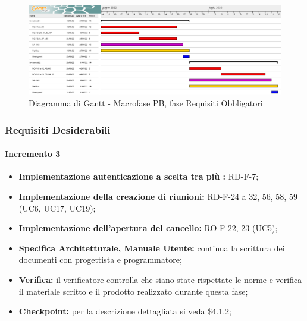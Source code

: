 \begin{landscape}
	\begin{figure}
	\includegraphics[width=\linewidth]{images/PB_obbligatori.png}
    \caption{Diagramma di Gantt - Macrofase PB, fase Requisiti Obbligatori}
	\end{figure}
\end{landscape}

\subsubsection{Requisiti Desiderabili}
\paragraph{Incremento 3}
\begin{itemize}
    \item \textbf{Implementazione autenticazione a scelta tra più :} RD-F-7;
    \item \textbf{Implementazione della creazione di riunioni:} RD-F-24 a 32, 56, 58, 59 (UC6, UC17, UC19);
    \item \textbf{Implementazione dell'apertura del cancello:} RO-F-22, 23 (UC5);
    \item \textbf{Specifica Architetturale, Manuale Utente:} continua la scrittura dei documenti con progettista e programmatore;
    \item \textbf{Verifica:} il verificatore controlla che siano state rispettate le norme e verifica il materiale scritto e il prodotto realizzato durante questa fase;
    \item \textbf{Checkpoint:} per la descrizione dettagliata si veda \$4.1.2;
\end{itemize}

